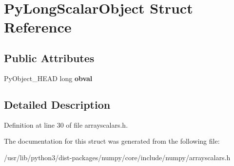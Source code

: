\hypertarget{structPyLongScalarObject}{}\section{Py\+Long\+Scalar\+Object Struct Reference}
\label{structPyLongScalarObject}
\subsection*{Public Attributes}
\begin{DoxyCompactItemize}
\item 
Py\+Object\+\_\+\+H\+E\+AD long {\bfseries obval}\hypertarget{structPyLongScalarObject_a34888744cd25d4bd8e4d902e8ea6875e}{}\label{structPyLongScalarObject_a34888744cd25d4bd8e4d902e8ea6875e}

\end{DoxyCompactItemize}


\subsection{Detailed Description}


Definition at line 30 of file arrayscalars.\+h.



The documentation for this struct was generated from the following file\+:\begin{DoxyCompactItemize}
\item 
/usr/lib/python3/dist-\/packages/numpy/core/include/numpy/arrayscalars.\+h\end{DoxyCompactItemize}
